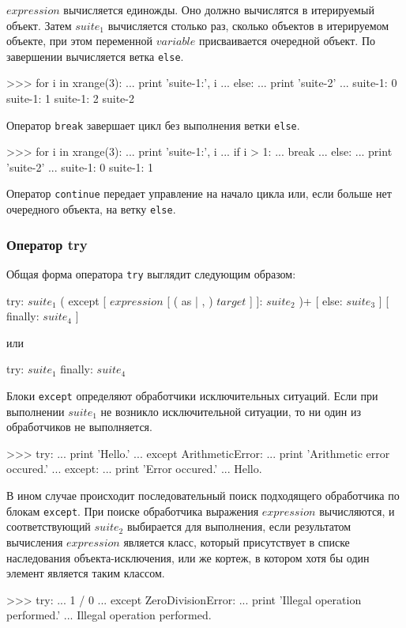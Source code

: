 $expression$ вычисляется единожды. Оно должно вычислятся в итерируемый объект. Затем $suite_1$ вычисляется столько раз, сколько объектов в итерируемом объекте, при этом переменной $variable$ присваивается очередной объект. По завершении вычисляется ветка \lstinline{else}.
\begin{pylst}{}{}
>>> for i in xrange(3):
...     print 'suite-1:', i
... else:
...     print 'suite-2'
...
suite-1: 0
suite-1: 1
suite-1: 2
suite-2
\end{pylst}

Оператор \lstinline{break} завершает цикл без выполнения ветки \lstinline{else}.
\begin{pylst}{}{}
>>> for i in xrange(3):
...     print 'suite-1:', i
...     if i > 1:
...         break
... else:
...     print 'suite-2'
...
suite-1: 0
suite-1: 1
\end{pylst}

Оператор \lstinline{continue} передает управление на начало цикла или, если больше нет очередного объекта, на ветку \lstinline{else}.

\subsubsection{Оператор try}
\label{sec:py-try-stmt}

Общая форма оператора \lstinline{try} выглядит следующим образом:
\begin{pylst}{}{}
try: $suite_1$
( except [ $expression$ [ ( as | , ) $target$ ] ]: $suite_2$ )+
[ else: $suite_3$ ]
[ finally: $suite_4$ ]
\end{pylst}
или
\begin{pylst}{}{}
try: $suite_1$
finally: $suite_4$
\end{pylst}

Блоки \lstinline{except} определяют обработчики исключительных ситуаций. Если при выполнении $suite_1$ не возникло исключительной ситуации, то ни один из обработчиков не выполняется.
\begin{pylst}{}{}
>>> try:
...     print 'Hello.'
... except ArithmeticError:
...     print 'Arithmetic error occured.'
... except:
...     print 'Error occured.'
...
Hello.
\end{pylst}

В ином случае происходит последовательный поиск подходящего обработчика по блокам \lstinline{except}. При поиске обработчика выражения $expression$ вычисляются, и соответствующий $suite_2$ выбирается для выполнения, если результатом вычисления $expression$ является класс, который присутствует в списке наследования объекта-исключения, или же кортеж, в котором хотя бы один элемент является таким классом.
\begin{pylst}{}{}
>>> try:
...     1 / 0
... except ZeroDivisionError:
...     print 'Illegal operation performed.'
...
Illegal operation performed.
\end{pylst}

